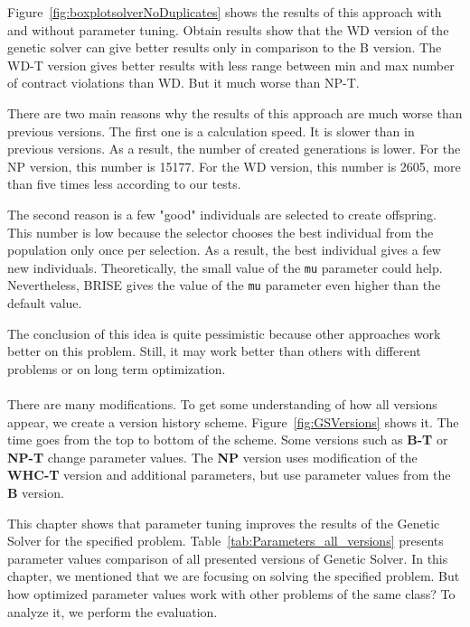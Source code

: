 Figure~\ref{fig:boxplotsolverNoDuplicates} shows the results of this approach with and without parameter tuning. Obtain results show that the WD version of the genetic solver can give better results only in comparison to the B version. The WD-T version gives better results with less range between min and max number of contract violations than WD. But it much worse than NP-T.

There are two main reasons why the results of this approach are much worse than previous versions. The first one is a calculation speed. It is slower than in previous versions. As a result, the number of created generations is lower. For the NP version, this number is 15177. For the WD version, this number is 2605, more than five times less according to our tests.

The second reason is a few "good" individuals are selected to create offspring. This number is low because the selector chooses the best individual from the population only once per selection. As a result, the best individual gives a few new individuals. Theoretically, the small value of the \texttt{mu} parameter could help. Nevertheless, BRISE gives the value of the \texttt{mu} parameter even higher than the default value. 

The conclusion of this idea is quite pessimistic because other approaches work better on this problem. Still, it may work better than others with different problems or on long term optimization.

\paragraph*{} There are many modifications. To get some understanding of how all versions appear, we create a version history scheme. Figure~\ref{fig:GSVersions} shows it. The time goes from the top to bottom of the scheme. Some versions such as \textbf{B-T} or \textbf{NP-T} change parameter values. The \textbf{NP} version uses modification of the \textbf{WHC-T} version and additional parameters, but use parameter values from the \textbf{B} version.

This chapter shows that parameter tuning improves the results of the Genetic Solver for the specified problem. Table~\ref{tab:Parameters_all_versions} presents parameter values comparison of all presented versions of Genetic Solver. In this chapter, we mentioned that we are focusing on solving the specified problem. But how optimized parameter values work with other problems of the same class? To analyze it, we perform the evaluation.

